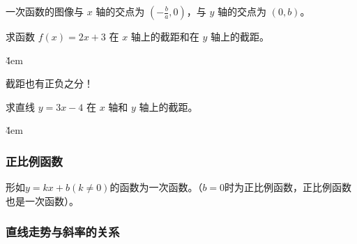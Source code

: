\begin{theorem}[截距]
    \begin{minipage}[c]{0.55\textwidth}
        一次函数的图像与 $x$ 轴的交点为 $(-\frac{b}{a}, 0)$，与 $y$ 轴的交点为 $(0, b)$。
    \end{minipage}%
    \begin{minipage}[c]{0.45\textwidth}
        \centering
    \end{minipage}
\end{theorem}

\begin{example}
    求函数 $f(x) = 2x + 3$ 在 $x$ 轴上的截距和在 $y$ 轴上的截距。
\end{example}

\v{4em}

\begin{warning}
    截距也有正负之分！
\end{warning}

\begin{example}
    求直线 $y= 3x - 4$ 在 $x$ 轴和 $y$ 轴上的截距。
\end{example}

\v{4em}

\subsubsection{正比例函数}

\begin{definition}[正比例函数]
    形如$y=kx+b(k\ne 0)$的函数为一次函数。（$b=0$时为正比例函数，正比例函数也是一次函数）。
\end{definition}

\subsubsection{直线走势与斜率的关系}

